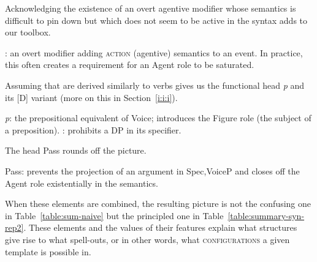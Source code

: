 \begin{exe}
\begin{xlist}
\begin{xlist}
\begin{xlist}
\begin{xlist}
\begin{xlist}
\begin{xlist}
\begin{exe}
\begin{xlist}
Acknowledging the existence of an overt agentive modifier whose semantics is difficult to pin down but which does not seem to be active in the syntax adds {\va} to our toolbox.
 \begin{exe}
\ex  {\va}: an overt modifier adding \textsc{action} (agentive) semantics to an event. In practice, this often creates a requirement for an Agent role to be saturated. 
 \z 

Assuming that  are derived similarly to verbs gives us the functional head \textit{p} and its [\textminus{}D] variant {\pz} (more on this in Section~\ref{i:i:i}).
 \begin{exe}
 \ex  
 \begin{xlist} 
 	\ex  \textit{p}: the prepositional equivalent of Voice; introduces the Figure role (the subject of a preposition). 
 	\ex  {\pz}: prohibits a DP in its specifier. 
 \z
\z 

The  head Pass rounds off the picture.
 \begin{exe}
\ex  Pass: prevents the projection of an argument in Spec,VoiceP and closes off the Agent role existentially in the semantics. 
 \z 

When these elements are combined, the resulting picture is not the confusing one in Table~\ref{table:sum-naive} but the principled one in Table~\ref{table:summary-syn-rep2}. These elements and the values of their features explain what structures give rise to what spell-outs, or in other words, what \textsc{configurations} a given template is possible in.
\begin{table}
\end{table}
\end{exe}
\end{xlist}
\end{exe}
\end{exe}
\end{xlist}
\end{exe}
\end{xlist}
\end{xlist}
\end{xlist}
\end{xlist}
\end{xlist}
\end{xlist}
\end{exe}
